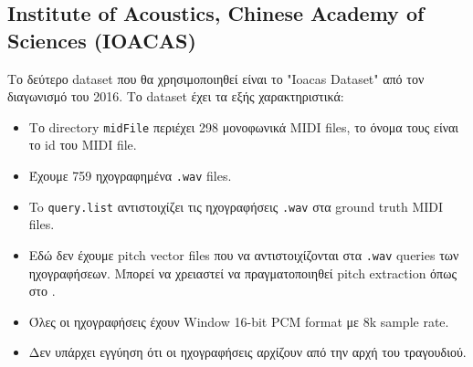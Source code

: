 \subsection{Institute of Acoustics, Chinese Academy of Sciences (IOACAS)}
Το δεύτερο dataset που θα χρησιμοποιηθεί είναι το "Ioacas Dataset"\cite{IOACAS-dataset} από τον διαγωνισμό του 2016. Το dataset έχει τα εξής χαρακτηριστικά:
\begin{itemize}
\item Το directory \texttt{midFile} περιέχει 298 μονοφωνικά MIDI files, το όνομα τους είναι το id του MIDI file.
\item Έχουμε 759 ηχογραφημένα \texttt{.wav} files.
\item To \texttt{query.list} αντιστοιχίζει τις ηχογραφήσεις \texttt{.wav} στα ground truth MIDI files.
\item Εδώ δεν έχουμε pitch vector files που να αντιστοιχίζονται στα \texttt{.wav} queries των ηχογραφήσεων.
Μπορεί να χρειαστεί να πραγματοποιηθεί pitch extraction όπως στο \cite{park2015query}.
\item Όλες οι ηχογραφήσεις έχουν Window 16-bit PCM format με 8k sample rate.
\item Δεν υπάρχει εγγύηση ότι οι ηχογραφήσεις αρχίζουν από την αρχή του τραγουδιού.
\end{itemize}
